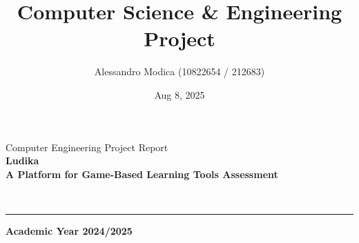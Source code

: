 \documentclass[11pt,italian,a4paper]{article}
\title{Computer Science & Engineering Project}
\author{Alessandro Modica (10822654 / 212683)}
\date{Aug 8, 2025}
\begin{document}
\begin{titlepage}
    \begin{center}

        \Huge{Computer Engineering Project Report}\\
        \vspace*{0.5cm}
        \Huge\textbf{Ludika}\\
        \LARGE\textbf{A Platform for Game-Based Learning Tools Assessment}\\

        \vspace*{1cm}

         \\
        \rule[0.5ex]{\textwidth}{0.5pt}


        \vspace*{2cm}

        \begin{minipage}{0.6\textwidth}
            \begin{flushleft}
                \Large{}
            \end{flushleft}
        \end{minipage}
        \begin{minipage}{0.35\textwidth}
            \begin{flushright}
                \Large\noindent\textbf{Academic Year 2024/2025}
            \end{flushright}
        \end{minipage}

    \end{center}

    \vfill


\end{titlepage}
\end{document}
